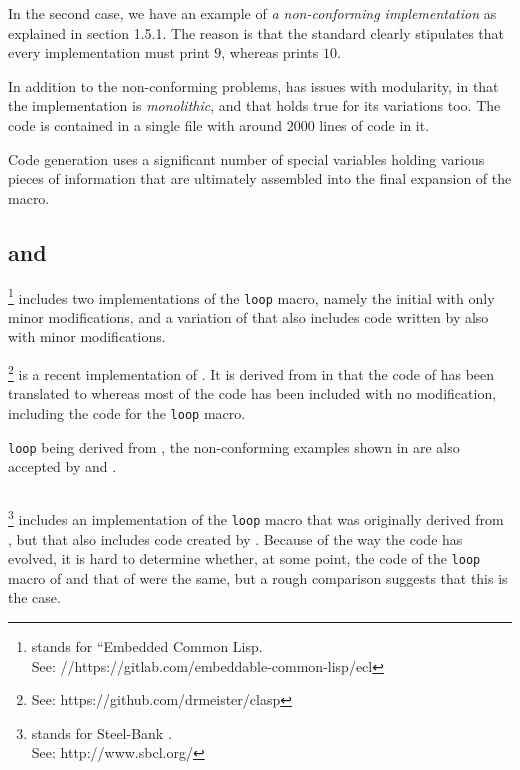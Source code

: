 In the second case, we have an example of \emph{a non-conforming
  implementation} as explained in section 1.5.1.  The reason is that
the standard clearly stipulates that every implementation must print
$9$, whereas \mitloop{} prints $10$.

In addition to the non-conforming problems, \mitloop{} has issues with
modularity, in that the implementation is \emph{monolithic}, and that
holds true for its variations too.  The code is contained in a single
file with around $2000$ lines of code in it.

Code generation uses a significant number of special variables holding
various pieces of information that are ultimately assembled into the
final expansion of the macro.

\subsection{\ecl{} and \clasp{}}

\ecl{}%
\footnote{\ecl{} stands for ``Embedded Common Lisp.\\
See: //https://gitlab.com/embeddable-common-lisp/ecl}
includes two implementations of the \texttt{loop} macro, namely
the initial \mitloop{} with only minor modifications, and a variation
of \mitloop{} that also includes code written
by \symbolics{} also with minor modifications.

\clasp{}%
\footnote{See: https://github.com/drmeister/clasp}
is a recent implementation of \commonlisp{}.  It is derived
from \ecl{} in that the \clanguage{} code of \ecl{} has been
translated to \cplusplus{} whereas most of the \commonlisp{} code has
been included with no modification, including the code for the
\texttt{loop} macro.

\ecl{} \texttt{loop} being derived from \mitloop{}, the non-conforming
examples shown in  are also accepted by \ecl{} and
\clasp{}.

\subsection{\sbcl{}}

\sbcl{}%
\footnote{\sbcl{} stands for Steel-Bank \commonlisp{}.\\ See:
  http://www.sbcl.org/} includes an implementation of the
\texttt{loop} macro that was originally derived from \mitloop{}, but
that also includes code created by \symbolics{}.  Because of the way
the code has evolved, it is hard to determine whether, at some point,
the code of the \texttt{loop} macro of \sbcl{} and that of \ecl{} were
the same, but a rough comparison suggests that this is the case.

